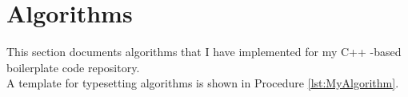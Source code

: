 









\chapter{Algorithms}
\label{chp:Algorithms}


This section documents algorithms that I have implemented for my C++ -based boilerplate code repository. \\


A template for typesetting algorithms is shown in {\sc Procedure} \ref{lst:MyAlgorithm}.

